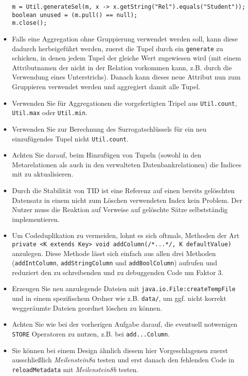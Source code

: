 \begin{itemize}
\begin{verbatim}
m = Util.generateSel(m, x -> x.getString("Rel").equals("Student"));
boolean unused = (m.pull() == null);
m.close();
\end{verbatim}
	\item Falls eine Aggregation ohne Gruppierung verwendet werden soll, kann diese dadurch herbeigeführt werden, zuerst die Tupel durch ein \texttt{generate} zu schicken, in denen jedem Tupel der gleiche Wert zugewiesen wird (mit einem Attributnamen der nicht in der Relation vorkommen kann, z.B. durch die Verwendung eines Unterstrichs).
		Danach kann dieses neue Attribut nun zum Gruppieren verwendet werden und aggregiert damit alle Tupel.
	\item Verwenden Sie für Aggregationen die vorgefertigten Tripel aus \texttt{Util.count}, \texttt{Util.max} oder \texttt{Util.min}.
	\item Verwenden Sie zur Berechnung des Surrogatschlüssels für ein neu einzufügendes Tupel nicht \texttt{Util.count}.
	\item Achten Sie darauf, beim Hinzufügen von Tupeln (sowohl in den Metarelationen als auch in den verwalteten Datenbankrelationen) die Indices mit zu aktualisieren.
	\item Durch die Stabilität von TID ist eine Referenz auf einen bereits gelöschten Datensatz in einem nicht zum Löschen verwendeten Index kein Problem.
			Der Nutzer muss die Reaktion auf Verweise auf gelöschte Sätze selbstständig implementieren.
	\item Um Codeduplikation zu vermeiden, lohnt es sich oftmals, Methoden der Art \texttt{private <K extends Key> void addColumn(/*...*/, K defaultValue)} anzulegen.
			Diese Methode lässt sich einfach aus allen drei Methoden (\texttt{addIntColumn}, \texttt{addStringColumn} und \texttt{addBoolColumn}) aufrufen und reduziert den zu schreibenden und zu debuggenden Code um Faktor 3.
	\item Erzeugen Sie neu anzulegende Dateien mit \texttt{java.io.File:createTempFile} und in einem spezifischem Ordner wie z.B. \texttt{data/}, um ggf. nicht korrekt weggeräumte Dateien geordnet löschen zu können.
	\item Achten Sie wie bei der vorherigen Aufgabe darauf, die eventuell notwenigen \texttt{STORE} Operatoren zu nutzen, z.B. bei \texttt{add...Column}.
	\item Sie können bei einem Design ähnlich diesem hier Vorgeschlagenen zuerst ausschließlich \textit{Meilenstein8a} testen und erst danach den fehlenden Code in \texttt{reloadMetadata} mit \textit{Meilenstein8b} testen.
\end{itemize}
